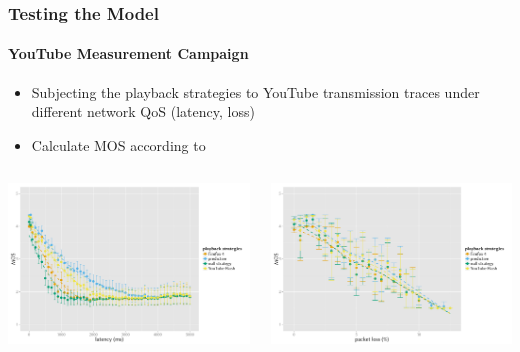 \documentclass{beamer}
\begin{document}
\begin{frame}
	\frametitle{Testing the Model}
	\framesubtitle{YouTube Measurement Campaign}

	\begin{itemize}
		\item Subjecting the playback strategies to YouTube transmission traces under different network QoS (latency, loss)
		\item Calculate MOS according to \cite{hossfeld2013youtubeqoe}
	\end{itemize}
	\vspace{-0.25cm}
	\begin{columns}[T]
			\centering
			\includegraphics[width=\columnwidth]{../../chapters/03-streaming/images/R-playbackemulation-qoe-latency.pdf}
		
			\centering
			\includegraphics[width=\columnwidth]{../../chapters/03-streaming/images/R-playbackemulation-qoe-loss.pdf}
	\end{columns}


\end{frame}
\end{document}
